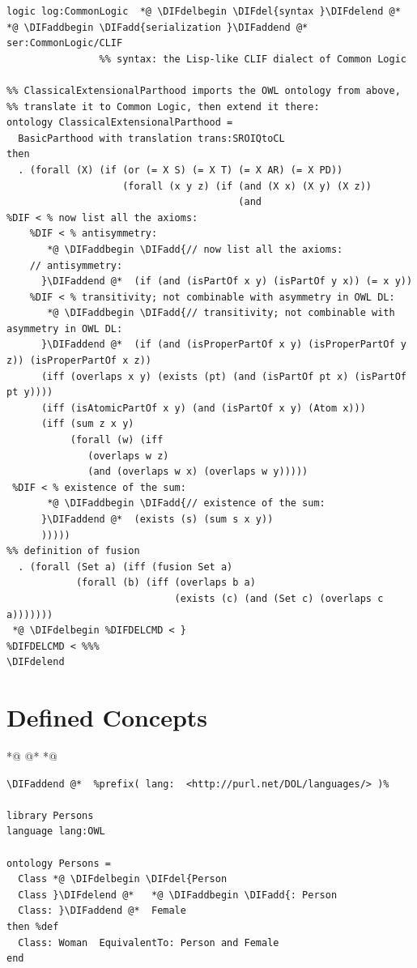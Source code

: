 \documentclass[10pt,fleqn,final]{scrreprt}
\newcommand{\sclause}[1]{\section{#1}}
\providecommand{\DIFadd}[1]{{\protect\color{blue}\uwave{#1}}} %
\providecommand{\DIFdel}[1]{{\protect\color{red}\sout{#1}}}                      %
\providecommand{\DIFaddbegin}{} %
\providecommand{\DIFaddend}{} %
\providecommand{\DIFdelbegin}{} %
\providecommand{\DIFdelend}{} %
\begin{document}
\begin{lstlisting}[basicstyle=\ttfamily,language=dolText,alsolanguage=owl2Manchester,alsolanguage=clif,escapechar=@,mathescape]
logic log:CommonLogic  *@ \DIFdelbegin \DIFdel{syntax }\DIFdelend @*   *@ \DIFaddbegin \DIFadd{serialization }\DIFaddend @*  ser:CommonLogic/CLIF
                %% syntax: the Lisp-like CLIF dialect of Common Logic

%% ClassicalExtensionalParthood imports the OWL ontology from above, 
%% translate it to Common Logic, then extend it there:
ontology ClassicalExtensionalParthood =
  BasicParthood with translation trans:SROIQtoCL
then
  . (forall (X) (if (or (= X S) (= X T) (= X AR) (= X PD))
                    (forall (x y z) (if (and (X x) (X y) (X z))
                                        (and                          
%DIF < % now list all the axioms: 
	%DIF < % antisymmetry:
       *@ \DIFaddbegin \DIFadd{// now list all the axioms: 
	// antisymmetry:
      }\DIFaddend @*  (if (and (isPartOf x y) (isPartOf y x)) (= x y)) 
	%DIF < % transitivity; not combinable with asymmetry in OWL DL:
       *@ \DIFaddbegin \DIFadd{// transitivity; not combinable with asymmetry in OWL DL:
      }\DIFaddend @*  (if (and (isProperPartOf x y) (isProperPartOf y z)) (isProperPartOf x z))
      (iff (overlaps x y) (exists (pt) (and (isPartOf pt x) (isPartOf pt y))))
      (iff (isAtomicPartOf x y) (and (isPartOf x y) (Atom x)))
      (iff (sum z x y)
           (forall (w) (iff 
		   	  (overlaps w z) 
			  (and (overlaps w x) (overlaps w y)))))
 %DIF < % existence of the sum:
       *@ \DIFaddbegin \DIFadd{// existence of the sum:
      }\DIFaddend @*  (exists (s) (sum s x y))                                          
      )))))
%% definition of fusion	  
  . (forall (Set a) (iff (fusion Set a)                                  
            (forall (b) (iff (overlaps b a)
                             (exists (c) (and (Set c) (overlaps c a)))))))
 *@ \DIFdelbegin %DIFDELCMD < }
%DIFDELCMD < %%%
\DIFdelend \end{lstlisting}

\sclause{Defined Concepts} *@ \DIFdelbegin %
\DIFdelend @*   *@ \DIFaddbegin \label{ex:definedconcepts}
\begin{lstlisting}[basicstyle=\ttfamily,language=dolText,alsolanguage=OWL2manchester,escapechar=@,mathescape]
\DIFaddend @*  %prefix( lang:  <http://purl.net/DOL/languages/> )%

library Persons
language lang:OWL

ontology Persons =
  Class *@ \DIFdelbegin \DIFdel{Person
  Class }\DIFdelend @*   *@ \DIFaddbegin \DIFadd{: Person
  Class: }\DIFaddend @*  Female
then %def
  Class: Woman  EquivalentTo: Person and Female
end
\end{lstlisting}
\end{document}
